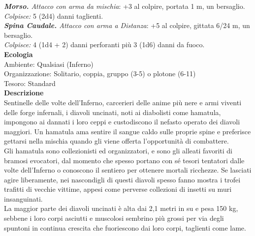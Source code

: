 \begin{multicols}{2}
\emph{\textbf{Morso.} Attacco con arma da mischia}: +3 al colpire, portata 1 m, un bersaglio.\\
\emph{Colpisce:} 5 (2d4) danni taglienti.\\
\emph{\textbf{Spina Caudale.} Attacco con arma a Distanza}: +5 al colpire, gittata 6/24 m, un bersaglio.\\
\emph{Colpisce:} 4 (1d4 + 2) danni perforanti più 3 (1d6) danni da fuoco.\\
\textbf{Ecologia}\\
Ambiente: Qualsiasi (Inferno)\\
Organizzazione: Solitario, coppia, gruppo (3-5) o plotone (6-11)\\
Tesoro: Standard\\
\textbf{Descrizione}\\
Sentinelle delle volte dell'Inferno, carcerieri delle anime più nere e armi viventi delle forge infernali, i diavoli uncinati, noti ai diabolisti come hamatula, impongono ai dannati i loro ceppi e custodiscono il nefasto operato dei diavoli maggiori. Un hamatula ama sentire il sangue caldo sulle proprie spine e preferisce gettarsi nella mischia quando gli viene offerta l'opportunità di combattere.\\
Gli hamatula sono collezionisti ed organizzatori, e sono gli alleati favoriti di bramosi evocatori, dal momento che spesso portano con sé tesori tentatori dalle volte dell'Inferno o conoscono il sentiero per ottenere mortali ricchezze. Se lasciati agire liberamente, nei nascondigli di questi diavoli spesso fanno mostra i trofei trafitti di vecchie vittime, appesi come perverse collezioni di insetti su muri insanguinati.\\
La maggior parte dei diavoli uncinati è alta dai 2,1 metri in su e pesa 150 kg, sebbene i loro corpi asciutti e muscolosi sembrino più grossi per via degli spuntoni in continua crescita che fuoriescono dai loro corpi, taglienti come lame.\\


\end{multicols}
